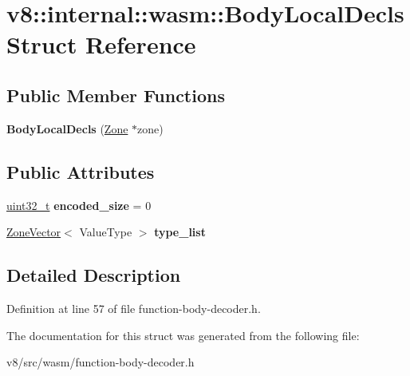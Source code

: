 \hypertarget{structv8_1_1internal_1_1wasm_1_1BodyLocalDecls}{}\section{v8\+:\+:internal\+:\+:wasm\+:\+:Body\+Local\+Decls Struct Reference}
\label{structv8_1_1internal_1_1wasm_1_1BodyLocalDecls}
\subsection*{Public Member Functions}
\begin{DoxyCompactItemize}
\item 
\mbox{\label{structv8_1_1internal_1_1wasm_1_1BodyLocalDecls_af1731e772c5705d7fa39e43935d65a66}} 
{\bfseries Body\+Local\+Decls} (\mbox{\hyperlink{classv8_1_1internal_1_1Zone}{Zone}} $\ast$zone)
\end{DoxyCompactItemize}
\subsection*{Public Attributes}
\begin{DoxyCompactItemize}
\item 
\mbox{\label{structv8_1_1internal_1_1wasm_1_1BodyLocalDecls_aa2440e2fcd54491bb1fb7f65487d937f}} 
\mbox{\hyperlink{classuint32__t}{uint32\+\_\+t}} {\bfseries encoded\+\_\+size} = 0
\item 
\mbox{\label{structv8_1_1internal_1_1wasm_1_1BodyLocalDecls_a16f9faa9d0ae9495b94530a759e80d69}} 
\mbox{\hyperlink{classv8_1_1internal_1_1ZoneVector}{Zone\+Vector}}$<$ Value\+Type $>$ {\bfseries type\+\_\+list}
\end{DoxyCompactItemize}


\subsection{Detailed Description}


Definition at line 57 of file function-\/body-\/decoder.\+h.



The documentation for this struct was generated from the following file\+:\begin{DoxyCompactItemize}
\item 
v8/src/wasm/function-\/body-\/decoder.\+h\end{DoxyCompactItemize}
